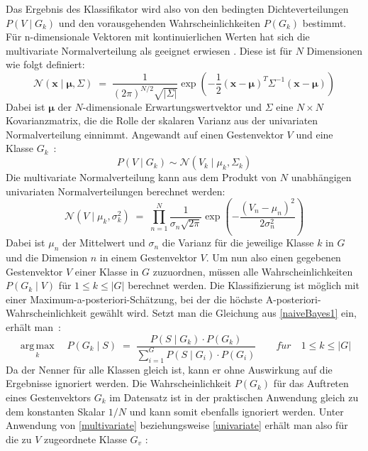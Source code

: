 Das Ergebnis des Klassifikator wird also von den bedingten Dichteverteilungen $P(V\mid G_k)$ und den vorausgehenden Wahrscheinlichkeiten $P(G_k)$ bestimmt. Für n-dimensionale Vektoren mit kontinuierlichen Werten hat sich die multivariate Normalverteilung als geeignet erwiesen \cite{flexibleSystem}. Diese ist für $N$ Dimensionen wie folgt definiert:
\begin{equation}
    {\mathcal {N}}(\mathbf{x} \mid \mathbf{\mu}, \Sigma) \; = \; \frac{1}{(2\pi)^{N/2} \sqrt{\lvert\Sigma\rvert}} \exp{ \left( -\frac{1}{2}(\mathbf{x} - \mathbf{\mu})^T \Sigma^{-1} (\mathbf{x} - \mathbf{\mu}) \right)}
\end{equation}
Dabei ist $\mathbf{\mu}$ der $N$-dimensionale Erwartungswertvektor und $\Sigma$ eine $N\times N$ Kovarianzmatrix, die die Rolle der skalaren Varianz aus der univariaten Normalverteilung einnimmt. Angewandt auf einen Gestenvektor $V$ und eine Klasse $G_k$~\cite{gillianANBC}:
\begin{equation} \label{multivariate} 
    {P(V\mid G_k)} \sim {\mathcal {N}}({V_k \mid \mu_k, \Sigma_k} )
\end{equation}
Die multivariate Normalverteilung kann aus dem Produkt von $N$ unabhängigen univariaten Normalverteilungen berechnet werden:
\begin{equation} \label{univariate}
    \mathcal {N}(V\mid \mu_k ,\sigma^{2}_k) \; = \; \prod_{n=1}^N {\frac {1}{\sigma_{n} \sqrt {2\pi}}}\operatorname {exp} \left(-{\frac {(V_n-\mu_{n} )^{2}}{2\sigma^{2}_{n}}}\right)
\end{equation}
Dabei ist $\mu_{n}$ der Mittelwert und $\sigma_{n}$ die Varianz für die jeweilige Klasse $k$ in $G$ und die Dimension $n$ in einem Gestenvektor $V$. Um nun also einen gegebenen Gestenvektor $V$ einer Klasse in $G$ zuzuordnen, müssen alle Wahrscheinlichkeiten $P(G_k\mid V)$ für $1\leq k\leq |G|$ berechnet werden. Die Klassifizierung ist möglich mit einer Maximum-a-posteriori-Schätzung, bei der die höchste A-posteriori-Wahrscheinlichkeit gewählt wird. Setzt man die Gleichung aus \eqref{naiveBayes1} ein, erhält man~\cite{gillianANBC}: 
\begin{equation}
    {\underset {k}{\operatorname {arg\,max} }\quad
        P(G_k\mid S) \; = \; \frac{P(S\mid G_k)\cdot P(G_k)}{\sum_{i=1} ^{G} P(S\mid G_i) \cdot P(G_i)}}\qquad
    f\ddot{u}r\quad 1\leq k\leq |G|
\end{equation}
Da der Nenner für alle Klassen gleich ist, kann er ohne Auswirkung auf die Ergebnisse ignoriert werden. Die Wahrscheinlichkeit $P(G_k)$ für das Auftreten eines Gestenvektors $G_k$ im Datensatz ist in der praktischen Anwendung gleich zu dem konstanten Skalar $1/N$ und kann somit ebenfalls ignoriert werden. Unter Anwendung von \eqref{multivariate} beziehungsweise \eqref{univariate} erhält man also für die zu $V$ zugeordnete Klasse $G_v$ \cite{gillianANBC}:
